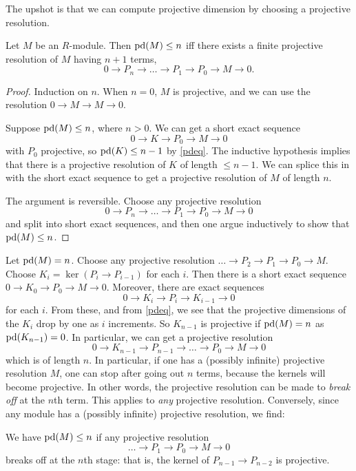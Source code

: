 The upshot is that {we can compute projective dimension
by choosing a
projective resolution.}
\begin{proposition}\label{pdprojectiveresolution}
Let $M$ be an $R$-module. Then $\mathrm{pd}(M) \leq n$ iff there exists
a finite
projective resolution of $M$ having $n+1$ terms,
\[ 0 \to P_n \to \dots \to P_1 \to P_0 \to M \to 0.  \]
\end{proposition}
\begin{proof}
Induction on $n$. When $n = 0$, $M$ is projective, and we can
use the
resolution $0 \to M \to M \to 0$.

Suppose $\mathrm{pd}(M) \leq n$, where $n >0$. We can get a short exact
sequence
\[ 0 \to K \to P_0 \to M \to 0  \]
with $P_0$ projective, so $\mathrm{pd}(K) \leq n-1$ by \eqref{pdeq}. The inductive
hypothesis implies
that there is a projective resolution of $K$ of length $\leq
n-1$. We can
splice this in with the short exact sequence to get a projective
resolution of
$M$ of length $n$.

The argument is reversible. Choose any projective resolution
\[  0 \to P_n \to \dots \to P_1 \to P_0 \to M \to 0 \]
and split into short exact sequences, and then one argue inductively to show
that $\mathrm{pd}(M) \leq n$.
\end{proof}

Let $\mathrm{pd}(M) = n$. Choose any projective resolution $\dots \to P_2 \to P_1 \to P_0 \to M$. Choose $K_i = \ker(P_i \to P_{i-1})$ for each $i$.  Then there is a short exact sequence $0 \to K_0 \to P_0 \to M
\to 0$. Moreover,
there are exact sequences
\[ 0 \to K_i \to P_i \to K_{i-1} \to 0  \]
for each $i$. From these, and from \eqref{pdeq}, we see that the projective dimensions
of the $K_i$
drop by one as $i$ increments. So $K_{n-1}$ is projective if
$\mathrm{pd}(M) = n$ as
$\mathrm{pd}(K_{n-1})=0$. In particular, we can get a projective
resolution
\[ 0 \to K_{n-1} \to P_{n-1} \to \dots \to P_0 \to M \to 0  \]
which is of length $n$.
In particular, if one has a (possibly infinite) projective resolution $M$, one can stop after going out $n$ terms, because the kernels
will become
projective. In other words, the projective resolution can be made to
\emph{break off} at the $n$th term. 
This applies to \emph{any} projective resolution. 
Conversely, since any module has a (possibly infinite) projective resolution,
we find:

\begin{proposition} 
We have $\mathrm{pd}(M) \leq n$ if any projective resolution
\[ \dots \to P_1 \to P_0 \to M \to 0  \]
breaks off at the $n$th stage: that is, the kernel of $P_{n-1} \to P_{n-2}$ is
projective.
\end{proposition} 


